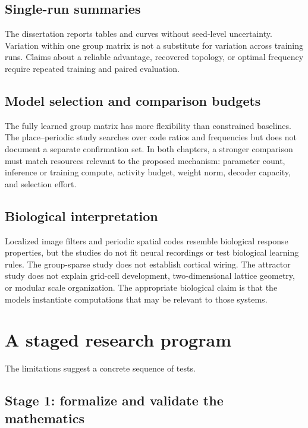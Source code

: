 \subsection{Single-run summaries}

The dissertation reports tables and curves without seed-level uncertainty. Variation within one group matrix is not a substitute for variation across training runs. Claims about a reliable advantage, recovered topology, or optimal frequency require repeated training and paired evaluation.

\subsection{Model selection and comparison budgets}

The fully learned group matrix has more flexibility than constrained baselines. The place--periodic study searches over code ratios and frequencies but does not document a separate confirmation set. In both chapters, a stronger comparison must match resources relevant to the proposed mechanism: parameter count, inference or training compute, activity budget, weight norm, decoder capacity, and selection effort.

\subsection{Biological interpretation}

Localized image filters and periodic spatial codes resemble biological response properties, but the studies do not fit neural recordings or test biological learning rules. The group-sparse study does not establish cortical wiring. The attractor study does not explain grid-cell development, two-dimensional lattice geometry, or modular scale organization. The appropriate biological claim is that the models instantiate computations that may be relevant to those systems.

\section{A staged research program}
\label{sec:synthesis-program}

The limitations suggest a concrete sequence of tests.

\subsection{Stage 1: formalize and validate the mathematics}

